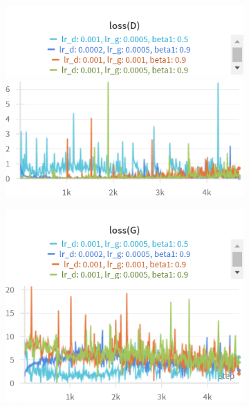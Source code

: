 \begin{figure}[H]
    \centering

    \begin{subfigure}{0.45\textwidth}
        \centering
        \includegraphics[width=0.95\linewidth]{lr/lossD.png}
        \caption{}
        \label{subfig:lr/lossD}
    \end{subfigure}%
    \begin{subfigure}{0.45\textwidth}
        \centering
        \includegraphics[width=0.95\linewidth]{lr/lossG.png}
        \caption{}
        \label{subfig:lr/lossG}
    \end{subfigure}


\end{figure}
